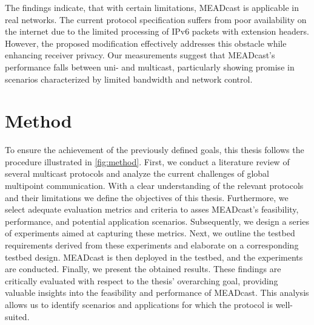 The findings indicate, that with certain limitations, MEADcast is applicable in
    real networks.
The current protocol specification suffers from poor availability on the
    internet due to the limited processing of IPv6 packets with extension
    headers.
However, the proposed modification effectively addresses this obstacle while
    enhancing receiver privacy.
Our measurements suggest that MEADcast's performance falls between uni- and
    multicast, particularly showing promise in scenarios characterized by
    limited bandwidth and network control.



\section{Method} %
\label{sec:Method}
To ensure the achievement of the previously defined goals, this thesis follows
    the procedure illustrated in \autoref{fig:method}.
First, we conduct a literature review of several multicast protocols and
    analyze the current challenges of global multipoint communication.
With a clear understanding of the relevant protocols and their limitations we
    define the objectives of this thesis.
Furthermore, we select adequate evaluation metrics and criteria to asses
    MEADcast's feasibility, performance, and potential application scenarios.
Subsequently, we design a series of experiments aimed at capturing these
    metrics.
Next, we outline the testbed requirements derived from these experiments and
    elaborate on a corresponding testbed design.
MEADcast is then deployed in the testbed, and the experiments are conducted.
Finally, we present the obtained results.
These findings are critically evaluated with respect to the thesis' overarching
    goal, providing valuable insights into the feasibility and performance of
    MEADcast.
This analysis allows us to identify scenarios and applications for which the
    protocol is well-suited.


